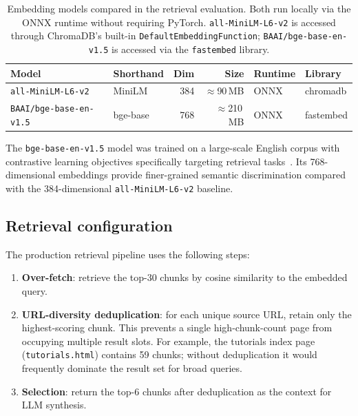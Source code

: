 \documentclass[12pt,a4paper]{article}
\begin{document}
\begin{table}[htbp]
  \centering
  \caption{Embedding models compared in the retrieval evaluation.
           Both run locally via the ONNX runtime without requiring PyTorch.
           \texttt{all-MiniLM-L6-v2} is accessed through ChromaDB's built-in
           \texttt{DefaultEmbeddingFunction};
           \texttt{BAAI/bge-base-en-v1.5} is accessed via the
           \texttt{fastembed} library.}
  \label{tab:models}
  \begin{tabular}{llrrll}
    \toprule
    Model & Shorthand & Dim & Size & Runtime & Library \\
    \midrule
    \texttt{all-MiniLM-L6-v2}     & MiniLM   & 384 & $\approx$90\,MB  & ONNX & chromadb \\
    \texttt{BAAI/bge-base-en-v1.5} & bge-base & 768 & $\approx$210\,MB & ONNX & fastembed \\
    \bottomrule
  \end{tabular}
\end{table}

The \texttt{bge-base-en-v1.5} model was trained on a large-scale English
corpus with contrastive learning objectives specifically targeting
retrieval tasks~\cite{bge2023embedding}.
Its 768-dimensional embeddings provide finer-grained semantic
discrimination compared with the 384-dimensional \texttt{all-MiniLM-L6-v2}
baseline.

\subsection{Retrieval configuration}
\label{sec:retrieval}

The production retrieval pipeline uses the following steps:

\begin{enumerate}[leftmargin=*]
  \item \textbf{Over-fetch}: retrieve the top-30 chunks by cosine similarity to
        the embedded query.
  \item \textbf{URL-diversity deduplication}: for each unique source URL, retain
        only the highest-scoring chunk.
        This prevents a single high-chunk-count page from occupying multiple
        result slots.
        For example, the tutorials index page (\texttt{tutorials.html}) contains
        59 chunks; without deduplication it would frequently dominate the result
        set for broad queries.
  \item \textbf{Selection}: return the top-6 chunks after deduplication as the
        context for LLM synthesis.
\end{enumerate}
\end{document}
